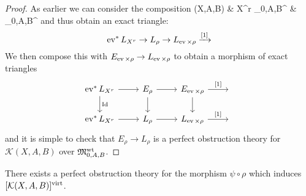 \begin{proof} As earlier we can consider the composition
\bcd
{}(X,A,B)  \ar[rr,"\rho",bend right=20] & X^r \times \MM_{0,A,B}^{} \ar[r,"\pi_2"] & \MM_{0,A,B}^{}
\ecd
and thus obtain an exact triangle:
\begin{equation*} \operatorname{ev}^* L_{X^r} \rightarrow L_\rho \rightarrow L_{\operatorname{ev} \times \rho} \xrightarrow{[1]} \end{equation*}
We then compose this with $E_{\operatorname{ev} \times \rho} \rightarrow L_{\operatorname{ev} \times \rho}$ to obtain a morphism of exact triangles
\begin{equation} \label{Morphism of exact triangles rho and ev times rho}
\begin{tikzcd}
\ev^* L_{X^r} \ar[r] \ar[d,"\Id"] & E_\rho \ar[r] \ar[d] & E_{\ev \times \rho} \ar[r,"{[1]}"] \ar[d] & \, \\
\ev^* L_{X^r} \ar[r] & L_\rho \ar[r] & L_{\ev \times \rho} \ar[r,"{[1]}"] & \,
\end{tikzcd}
\end{equation}
and it is simple to check that $E_\rho \to L_\rho$ is a perfect obstruction theory for $\mathcal{K}(X,A,B)$ over $\mathfrak M_{0,A,B}^{\operatorname{wt}}$. \end{proof}

\begin{lemma} \label{First part of pullback lemma} There exists a perfect obstruction theory for the morphism $\psi \circ \rho$ which induces $[\mathcal{K}(X,A,B)]^{\operatorname{virt}}$.\end{lemma}

